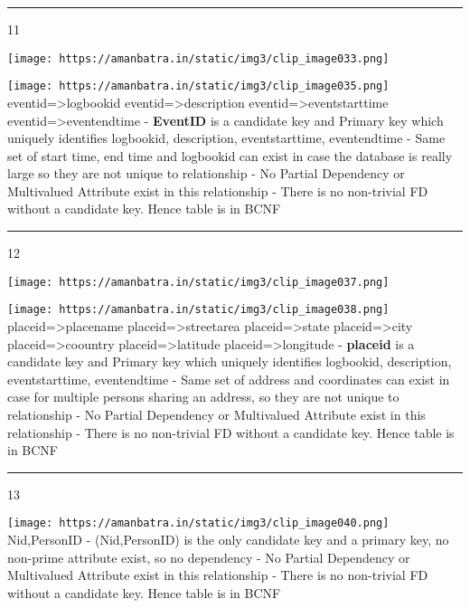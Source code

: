 \documentclass[
]{article}
\begin{document}
\begin{center}\rule{0.5\linewidth}{0.5pt}\end{center}

11

\texttt{[image: https://amanbatra.in/static/img3/clip\_image033.png]}

\texttt{[image: https://amanbatra.in/static/img3/clip\_image035.png]}
eventid=\textgreater logbookid eventid=\textgreater description
eventid=\textgreater eventstarttime eventid=\textgreater eventendtime -
\textbf{EventID} is a candidate key and Primary key which uniquely
identifies logbookid, description, eventstarttime, eventendtime - Same
set of start time, end time and logbookid can exist in case the database
is really large so they are not unique to relationship - No Partial
Dependency or Multivalued Attribute exist in this relationship - There
is no non-trivial FD without a candidate key. Hence table is in BCNF

\begin{center}\rule{0.5\linewidth}{0.5pt}\end{center}

12

\texttt{[image: https://amanbatra.in/static/img3/clip\_image037.png]}

\texttt{[image: https://amanbatra.in/static/img3/clip\_image038.png]}
placeid=\textgreater placename placeid=\textgreater streetarea
placeid=\textgreater state placeid=\textgreater city
placeid=\textgreater coountry placeid=\textgreater latitude
placeid=\textgreater longitude - \textbf{placeid} is a candidate key and
Primary key which uniquely identifies logbookid, description,
eventstarttime, eventendtime - Same set of address and coordinates can
exist in case for multiple persons sharing an address, so they are not
unique to relationship - No Partial Dependency or Multivalued Attribute
exist in this relationship - There is no non-trivial FD without a
candidate key. Hence table is in BCNF

\begin{center}\rule{0.5\linewidth}{0.5pt}\end{center}

13

\texttt{[image: https://amanbatra.in/static/img3/clip\_image040.png]}
Nid,PersonID - (Nid,PersonID) is the only candidate key and a primary
key, no non-prime attribute exist, so no dependency - No Partial
Dependency or Multivalued Attribute exist in this relationship - There
is no non-trivial FD without a candidate key. Hence table is in BCNF
\end{document}
